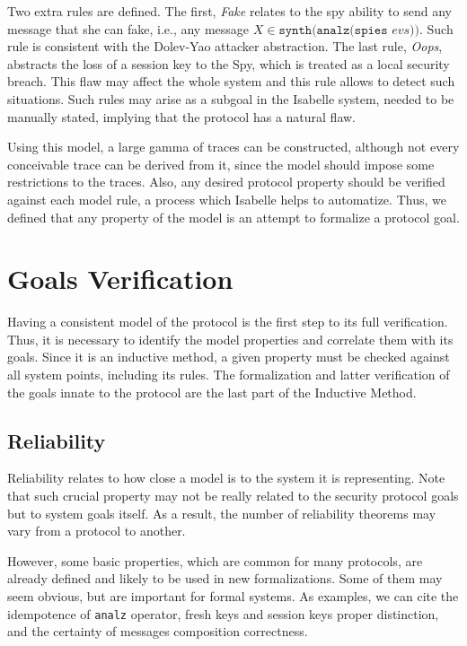 Two extra rules are defined. The first, \textit{Fake} relates to the spy ability to send any message that she can fake, i.e., any message $X \in \texttt{synth(analz(spies }\textit{evs} \texttt{))}$. Such rule is consistent with the Dolev-Yao attacker abstraction. The last rule, \textit{Oops}, abstracts the loss of a session key to the Spy, which is treated as a local security breach. This flaw may affect the whole system and this rule allows to detect such situations. Such rules may arise as a subgoal in the Isabelle system, needed to be manually stated, implying that the protocol has a natural flaw.

Using this model, a large gamma of traces can be constructed, although not every conceivable trace can be derived from it, since the model should impose some restrictions to the traces. Also, any desired protocol property should be verified against each model rule, a process which Isabelle helps to automatize. Thus, we defined that any property of the model is an attempt to formalize a protocol goal.


\section{Goals Verification}
Having a consistent model of the protocol is the first step to its full verification. Thus, it is necessary to identify the model properties and correlate them with its goals. Since it is an inductive method, a given property must be checked against all system points, including its rules. The formalization and latter verification of the goals innate to the protocol are the last part of the Inductive Method.

\subsection{Reliability}
Reliability relates to how close a model is to the system it is representing. Note that such crucial property may not be really related to the security protocol goals but to system goals itself. As a result, the number of reliability theorems may vary from a protocol to another.

However, some basic properties, which are common for many protocols, are already defined and likely to be used in new formalizations. Some of them may seem obvious, but are important for formal systems. As examples, we can cite the idempotence of \texttt{analz} operator, fresh keys and session keys proper distinction, and the certainty of messages composition correctness.

